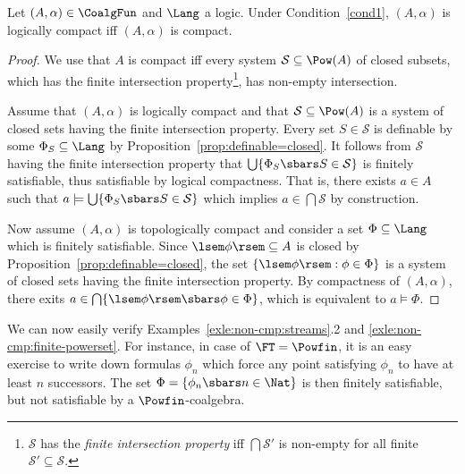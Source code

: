 \documentclass{entcs}
\begin{document}
\begin{prop} \label{prop:log-top-cmp}
Let $(A,\alpha)\in\CoalgFun$ and $\Lang$ a logic. Under
  Condition~\ref{cond1}, 
  $(A,\alpha)$ is logically compact iff 
  $(A,\alpha)$ is compact.
\end{prop}
\begin{proof}
  We use that $A$ is compact iff every system $\mathcal S \subseteq \Pow(A)$
  of closed subsets, which has the finite intersection
  property\footnote{$\mathcal S$ has the \emph{finite intersection property}
    iff $\bigcap\mathcal S'$ is non-empty for all finite $\mathcal
    S'\subseteq\mathcal S$.}, %
  has non-empty intersection.  
  
\sskip
  Assume that $(A,\alpha)$ is logically compact and that $\mathcal S
  \subseteq \Pow(A)$ is a system of closed sets having the finite
  intersection property. Every set $S \in \mathcal S$ is definable by
  some $\Phi_S \subseteq \Lang$ by
  Proposition~\ref{prop:definable=closed}. It follows from $\mathcal
  S$ having the finite intersection property that $\bigcup \lbrace
  \Phi_S \sbars S \in \mathcal S \rbrace$ is finitely satisfiable,
  thus satisfiable by logical compactness. That is, there exists $a
  \in A$ such that $a \models \bigcup \lbrace \Phi_S \sbars S \in
  \mathcal S \rbrace$ which implies $a \in \bigcap \mathcal S$ by
  construction.
  
  \sskip Now assume $(A,\alpha)$ is topologically compact and consider a set
  $\Phi \subseteq \Lang$ which is finitely satisfiable.  Since $\lsem \phi
  \rsem \subseteq A$ is closed by Proposition~\ref{prop:definable=closed}, the
  set $\lbrace \lsem \phi \rsem : \phi \in \Phi \rbrace$ is a
  system of closed sets having the finite intersection property. By
  compactness of $(A,\alpha)$, there exits $a \in \bigcap \lbrace \lsem \phi
  \rsem \sbars \phi \in \Phi \rbrace$, which is equivalent to $a\models \Phi$.
\end{proof}

\begin{example}\label{exle:log-top-cmp}
  We can now easily verify Examples~\ref{exle:non-cmp:streams}.2 and
  \ref{exle:non-cmp:finite-powerset}. For instance, in case of
  $\FT=\Powfin$, it is an easy exercise to write down formulas
  $\phi_n$ which force any point satisfying $\phi_n$ to have at least
  $n$ successors.  The set $\Phi = \lbrace \phi_n \sbars n \in \Nat
  \rbrace$ is then finitely satisfiable, but not satisfiable by a
  $\Powfin$-coalgebra.
\end{example}
\end{document}
